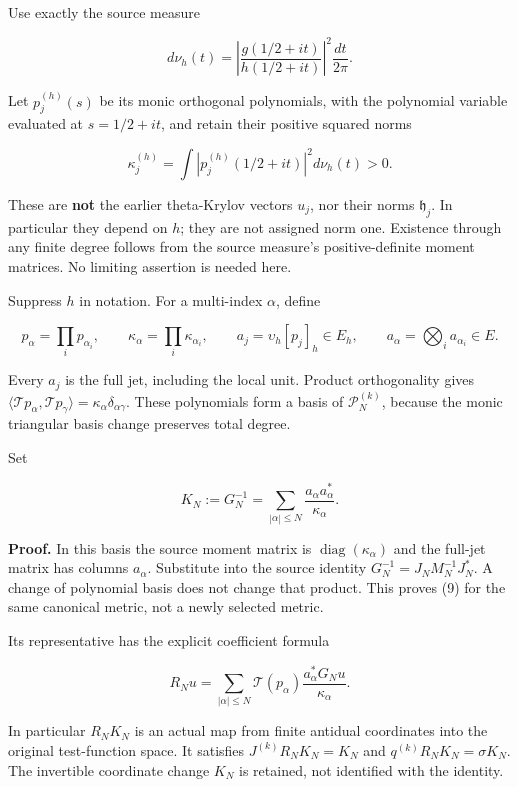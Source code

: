 Use exactly the source measure

\[
d\nu_h(t)=\left|\frac{g(1/2+it)}{h(1/2+it)}\right|^2\frac{dt}{2\pi}.
\tag{6}
\]

Let \(p_j^{(h)}(s)\) be its monic orthogonal polynomials, with the
polynomial variable evaluated at \(s=1/2+it\), and retain their positive
squared norms

\[
\kappa_j^{(h)}=\int|p_j^{(h)}(1/2+it)|^2d\nu_h(t)>0.
\tag{7}
\]

These are \textbf{not} the earlier theta-Krylov vectors \(u_j\), nor
their norms \(\mathfrak h_j\). In particular they depend on \(h\); they
are not assigned norm one. Existence through any finite degree follows
from the source measure's positive-definite moment matrices. No limiting
assertion is needed here.

Suppress \(h\) in notation. For a multi-index \(\alpha\), define

\[
p_\alpha=\prod_i p_{\alpha_i},\qquad
\kappa_\alpha=\prod_i\kappa_{\alpha_i},\qquad
a_j=\upsilon_h[p_j]_h\in E_h,\qquad
a_\alpha=\bigotimes_i a_{\alpha_i}\in E.
\tag{8}
\]

Every \(a_j\) is the full jet, including the local unit. Product
orthogonality gives
\(\langle\mathcal T p_\alpha,\mathcal T p_\gamma\rangle=\kappa_\alpha\delta_{\alpha\gamma}\).
These polynomials form a basis of \(\mathcal P_N^{(k)}\), because the
monic triangular basis change preserves total degree.

Set

\[
\boxed{K_N:=G_N^{-1}
=\sum_{|\alpha|\le N}\frac{a_\alpha a_\alpha^*}{\kappa_\alpha}.}
\tag{9}
\]

\textbf{Proof.} In this basis the source moment matrix is
\(\operatorname{diag}(\kappa_\alpha)\) and the full-jet matrix has
columns \(a_\alpha\). Substitute into the source identity
\(G_N^{-1}=J_NM_N^{-1}J_N^*\). A change of polynomial basis does not
change that product. This proves (9) for the same canonical metric, not
a newly selected metric.

Its representative has the explicit coefficient formula

\[
R_Nu=\sum_{|\alpha|\le N}\mathcal T(p_\alpha)
\frac{a_\alpha^*G_Nu}{\kappa_\alpha}.
\tag{10}
\]

In particular \(R_NK_N\) is an actual map from finite antidual
coordinates into the original test-function space. It satisfies
\(J^{(k)}R_NK_N=K_N\) and \(q^{(k)}R_NK_N=\sigma K_N\). The invertible
coordinate change \(K_N\) is retained, not identified with the identity.

